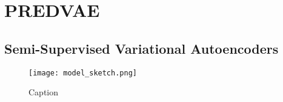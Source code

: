 \section{PREDVAE}
\label{sec:methods}





\subsection{Semi-Supervised Variational Autoencoders}
\label{subsec:ssvae}

\begin{figure}[ht!]
    \centering
    \texttt{[image: model\_sketch.png]}
    \caption{Caption}
    \label{fig:sketch}
\end{figure}

